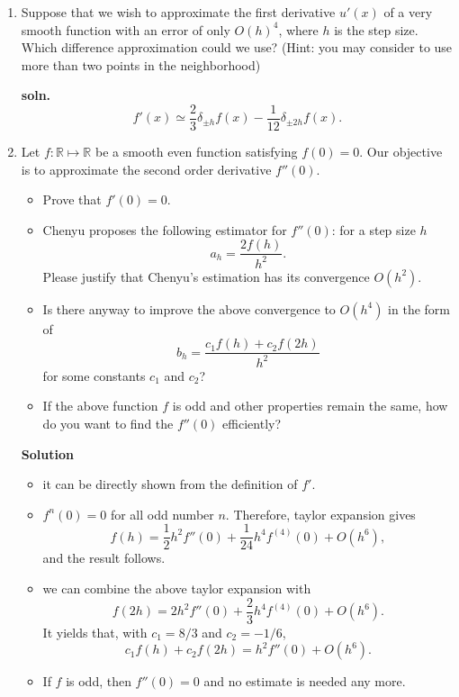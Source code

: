 \documentclass{article}
\begin{document}
\begin{enumerate}
 \item Suppose that we wish to approximate the first derivative $u'(x)$ of a very smooth function with an error of only $O(h)^4$, where $h$ is the step size. Which difference approximation could we use? (Hint: you may consider to use more than two points in the neighborhood)
 
 {\bf soln.} $$f'(x) \simeq \frac 2 3 \delta_{\pm h} f(x) - \frac 1 {12} \delta_{\pm 2h} f(x).$$
 
 \item 
Let $f:\mathbb R\mapsto \mathbb R$ be a smooth even function 
satisfying $f(0) = 0$. 
Our objective is to approximate  the second order derivative $f''(0)$. 
\begin{itemize}
 \item Prove that $f'(0) = 0.$
 \item Chenyu proposes the following estimator for $f''(0)$: for a step size $h$
 $$a_{h} = \frac{2f(h)}{h^{2}}.$$
 Please justify that Chenyu's estimation has its convergence $O(h^{2})$.
 \item Is there anyway to improve the above 
 convergence to $O(h^{4})$ in the form of 
 $$b_{h} = \frac{c_{1} f(h) + c_{2}f(2h)}{h^{2}}$$
 for some constants $c_{1}$ and $c_{2}$?
 \item If the above function $f$ is odd and other properties remain the same, how do you want to find the $f''(0)$ efficiently?
\end{itemize}

{\bf Solution}
\begin{itemize}
 \item it can be directly shown from the definition of $f'$.
 \item $f^{n}(0) = 0$ for all odd number $n$. Therefore, 
 taylor expansion gives 
 $$f(h) = \frac 1 2 h^{2} f''(0) + \frac 1 {24} h^{4}f^{(4)}(0) + O(h^{6}),$$
 and the result follows.
 \item we can combine the above taylor expansion with
 $$f(2h) = 2h^{2} f''(0) + \frac 2 3 h^{4} f^{(4)}(0) + O(h^{6}).$$
 It yields that, with $c_{1} = 8/3$ and $c_{2} = - 1/6$, 
 $$c_{1} f(h) + c_{2}f(2h) = h^{2}f''(0) + O(h^{6}).$$
 \item 
 If $f$ is odd, then $f''(0) = 0$ and no estimate is needed any more.
\end{itemize}
\end{enumerate}
\end{document}
